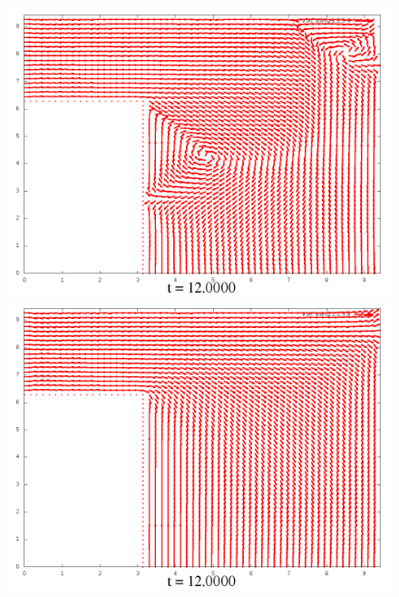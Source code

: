 \documentclass[a4paper, 12pt]{article}
\begin{document}
\begin{figure}[h]
	\begin{minipage}[h]{0.4\linewidth}
		\includegraphics[width=1\linewidth]{./img/01_1_1/V/60}
	\end{minipage}
	\hfill
	\begin{minipage}[h]{0.4\linewidth}
		\includegraphics[width=1\linewidth]{./img/01_1_01/V/60}
	\end{minipage}
\end{figure}
\end{document}
